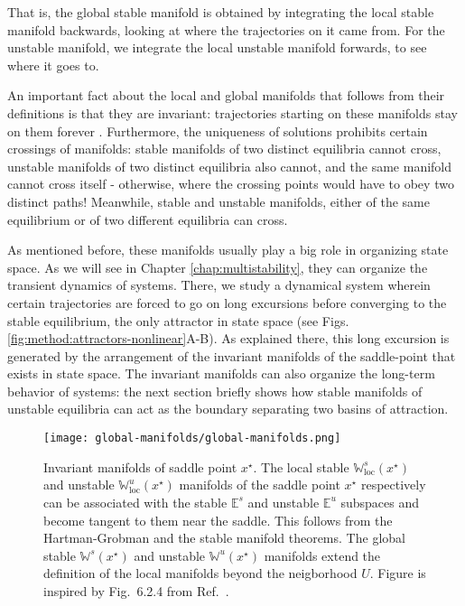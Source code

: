 That is, the global stable manifold is obtained by integrating the local stable manifold backwards, looking at where the trajectories on it came from. For the unstable manifold, we integrate the local unstable manifold forwards, to see where it goes to. 

An important fact about the local and global manifolds that follows from their definitions is that they are invariant: trajectories starting on these manifolds stay on them forever \cite{argyrisbook}.
Furthermore, the uniqueness of solutions prohibits certain crossings of manifolds: stable manifolds of two distinct equilibria cannot cross, unstable manifolds of two distinct equilibria also cannot, and the same manifold cannot cross itself - otherwise, where the crossing points would have to obey two distinct paths! Meanwhile, stable and unstable manifolds, either of the same equilibrium or of two different equilibria can cross. 

As mentioned before, these manifolds usually play a big role in organizing state space. As we will see in Chapter \ref{chap:multistability}, they can organize the transient dynamics of systems. There, we study a dynamical system wherein certain trajectories are forced to go on long excursions before converging to the stable equilibrium, the only attractor in state space (see Figs.\ref{fig:method:attractors-nonlinear}A-B). As explained there, this long excursion is generated by the arrangement of the invariant manifolds of the saddle-point that exists in state space. The invariant manifolds can also organize the long-term behavior of systems: the next section briefly shows how stable manifolds of unstable equilibria can act as the boundary separating two basins of attraction.


\begin{figure}
    \centering
    \texttt{[image: global-manifolds/global-manifolds.png]}
    \caption{Invariant manifolds of saddle point $x^\star$. The local stable $\mathbb{W}^s_\mathrm{loc}(x^\star)$ and unstable $\mathbb{W}^u_\mathrm{loc}(x^\star)$ manifolds of the saddle point $x^\star$ respectively can be associated with the stable $\mathbb{E}^s$ and unstable $\mathbb{E}^u$ subspaces and become tangent to them near the saddle. This follows from the Hartman-Grobman and the stable manifold theorems. The global stable $\mathbb{W}^s(x^\star)$ and unstable $\mathbb{W}^u(x^\star)$ manifolds extend the definition of the local manifolds beyond the neigborhood $U$.  Figure is inspired by Fig.~6.2.4 from Ref.~\cite{argyrisbook}.}
    \label{fig:method:invariantmanifolds}
\end{figure}

